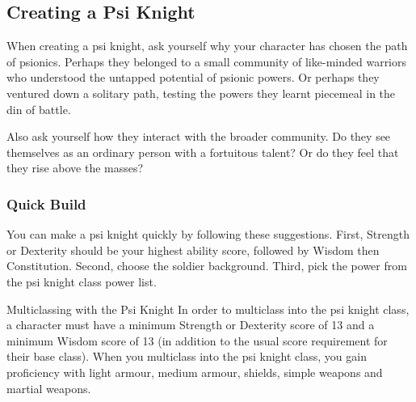 \subsection{Creating a Psi Knight}
When creating a psi knight,
ask yourself why your character has chosen the path of psionics.
Perhaps they belonged to a small community of like-minded warriors
who understood the untapped potential of psionic powers.
Or perhaps they ventured down a solitary path,
testing the powers they learnt piecemeal in the din of battle.

Also ask yourself how they interact with the broader community.
Do they see themselves as an ordinary person with a fortuitous
talent?
Or do they feel that they rise above the masses?

\subsubsection{Quick Build}
You can make a psi knight quickly by following these suggestions.
First, Strength or Dexterity should be your highest ability score,
followed by Wisdom then Constitution.
Second, choose the soldier background.
Third, pick the  power
from the psi knight class power list.

\begin{DndSidebar}[float=htbp]{Multiclassing with the Psi Knight}
    In order to
    multiclass into the psi knight class,
    a character must have a minimum Strength or Dexterity score of 13
    and a minimum Wisdom score of 13
    (in addition to the usual score requirement for their base class).
    When you multiclass into the psi knight class,
    you gain proficiency with
    light armour, medium armour, shields, simple weapons
    and martial weapons.
\end{DndSidebar}

